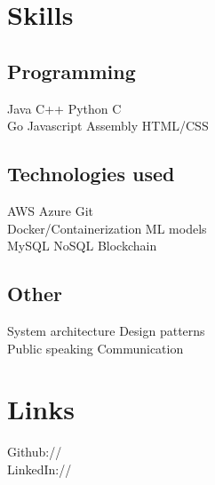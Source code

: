 \documentclass[]{deedy-resume-openfont}
\begin{document}
\begin{minipage}[t]{0.33\textwidth}

\section{Skills}
\subsection{Programming}
Java \textbullet{}   C++ \textbullet{} Python \textbullet{} C\\
Go \textbullet{} Javascript \textbullet{} Assembly \textbullet{} HTML/CSS \\
\sectionsep

\subsection{Technologies used}
AWS \textbullet{} Azure \textbullet{} Git  \\
Docker/Containerization \textbullet{} ML models \\
MySQL \textbullet{} NoSQL \textbullet{} Blockchain\\
\sectionsep

\subsection{Other}
System architecture \textbullet{} Design patterns\\
Public speaking \textbullet{} Communication\\
\sectionsep


\section{Links} 
Github:// \href{https://github.com/thenamanpat}{} \\
LinkedIn://  \href{https://www.linkedin.com/in/thenamanpat}{} \\
\sectionsep

%
%

\end{minipage} 
\hfill
\end{document}
